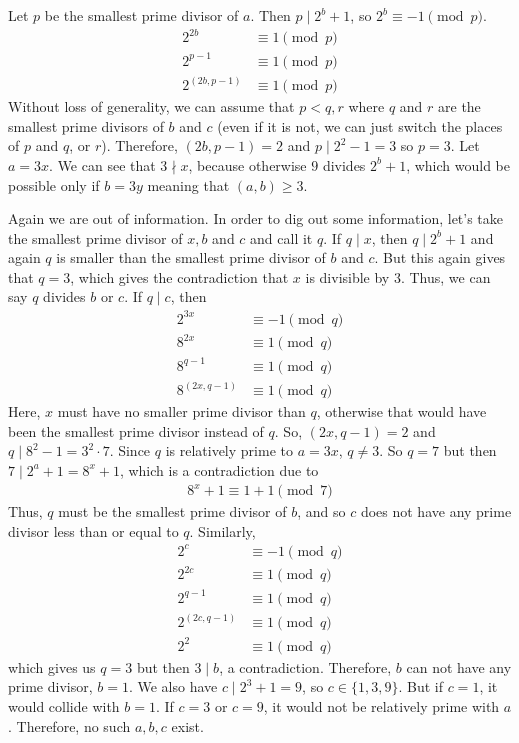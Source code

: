 \begin{solution}
	Let $p$ be the smallest prime divisor of $a$. Then $p\mid 2^b+1$, so $2^b\equiv-1\pmod p$.
		\begin{align*}
			2^{2b} & \equiv1\pmod p\\
			2^{p-1}& \equiv1\pmod p\\
			2^{(2b,p-1)}&\equiv1\pmod p
		\end{align*}
	Without loss of generality, we can assume that $p<q,r$ where $q$ and $r$  are the smallest prime divisors of $b$ and $c$ (even if it is not, we can just switch the places of $p$ and $q$, or $r$). Therefore, $(2b,p-1)=2$ and $p\mid 2^2-1=3$ so $p=3$. Let $a=3x$. We can see that $3\nmid x$, because otherwise $9$ divides $2^b+1$, which would be possible only if $b=3y$ meaning that $(a,b)\geq3$.

	Again we are out of information. In order to dig out some information, let's take the smallest prime divisor of $x,b$ and $c$ and call it $q$. If $q\mid x$, then $q\mid 2^b+1$ and again $q$ is smaller than the smallest prime divisor of $b$ and $c$. But this again gives that $q=3$, which gives the contradiction that $x$ is divisible by $3$. Thus, we can say $q$ divides $b$ or $c$. If $q\mid c$, then
		\begin{align*}
			2^{3x} & \equiv-1\pmod q\\
			8^{2x} & \equiv1\pmod q\\
			8^{q-1}& \equiv1\pmod q\\
			8^{(2x,q-1)}&\equiv1\pmod q
		\end{align*}
	Here, $x$ must have no smaller prime divisor than $q$, otherwise that would have been the smallest prime divisor instead of $q$. So, $(2x,q-1)=2$ and $q\mid 8^2-1=3^2\cdot7$. Since $q$ is relatively prime to $a=3x$, $q\neq3$. So $q=7$ but then $7\mid 2^a+1=8^x+1$, which is a contradiction due to
		\begin{align*}
			8^x+1\equiv1+1\pmod7
		\end{align*}
	Thus, $q$ must be the smallest prime divisor of $b$, and so $c$ does not have any prime divisor less than or equal to $q$. Similarly,
		\begin{align*}
			2^c
				& \equiv-1\pmod q\\
			2^{2c}&\equiv1\pmod q\\
			2^{q-1}&\equiv1\pmod q\\
			2^{(2c,q-1)}&\equiv1\pmod q\\
			2^2&\equiv1\pmod q
		\end{align*}
	which gives us $q=3$ but then $3\mid b$, a contradiction. Therefore, $b$ can not have any prime divisor, $b=1$. We also have $c\mid 2^3+1=9$, so $c\in\{1,3,9\}$. But if $c=1$, it would collide with $b=1$. If $c=3$ or $c=9$, it would not be relatively prime with $a$. Therefore, no such $a,b,c$ exist.
\end{solution}

